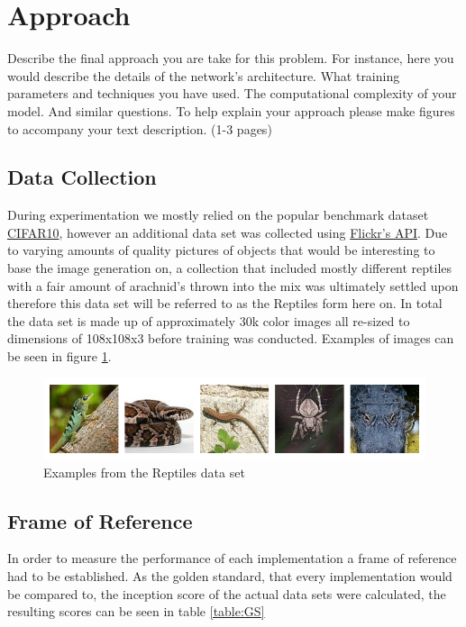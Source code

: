 
\section{Approach}

Describe the final approach you are take for this problem.
For instance, here you would describe the details of the network’s
architecture. What training parameters and techniques you have used.
The computational complexity of your model. And similar questions.
To help explain your approach please make figures to accompany your
text description. (1-3 pages)

\subsection{Data Collection}
During experimentation we mostly relied on the popular benchmark dataset \href{https://www.cs.toronto.edu/~kriz/cifar.html}{CIFAR10}, however an additional data set was collected using \href{https://www.flickr.com/services/api/}{Flickr's API}. Due to varying amounts of quality pictures of objects that would be interesting to base the image generation on, a collection that included mostly different reptiles with a fair amount of arachnid's thrown into the mix was ultimately settled upon therefore this data set will be referred to as the Reptiles form here on. In total the data set is made up of approximately 30k color images all re-sized to dimensions of 108x108x3 before training was conducted. Examples of images can be seen in figure \ref{fig:reptiles}.

\begin{figure}[h]
\centering
\includegraphics[width=\textwidth]{figures/reptiles.png}
\caption{Examples from the Reptiles data set}
\label{fig:reptiles}
\end{figure}




\subsection{Frame of Reference}
In order to measure the performance of each implementation a frame of reference had to be established. As the golden standard, that every implementation would be compared to, the inception score of the actual data sets were calculated, the resulting scores can be seen in table \ref{table:GS}

